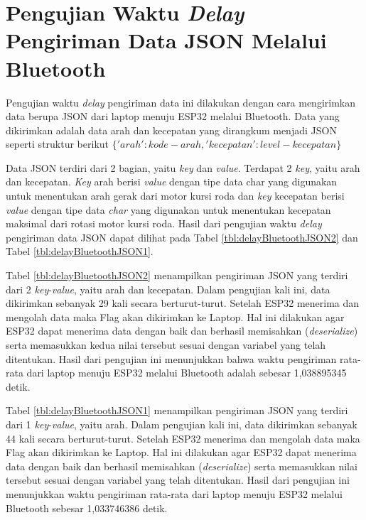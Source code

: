 \section{Pengujian Waktu \emph{Delay} Pengiriman Data JSON Melalui Bluetooth}
\label{sec:delayBluetoothJSON}

Pengujian waktu \emph{delay} pengiriman data ini dilakukan dengan cara mengirimkan data berupa JSON dari laptop menuju ESP32 melalui Bluetooth. Data yang dikirimkan adalah data arah dan kecepatan yang dirangkum menjadi JSON seperti struktur berikut \(\{'arah': kode-arah, 'kecepatan': level-kecepatan\}\) 

Data JSON terdiri dari 2 bagian, yaitu \emph{key} dan \emph{value}. Terdapat 2 \emph{key}, yaitu arah dan kecepatan. \emph{Key} arah berisi \emph{value} dengan tipe data char yang digunakan untuk menentukan arah gerak dari motor kursi roda dan \emph{key} kecepatan berisi \emph{value} dengan tipe data \emph{char} yang digunakan untuk menentukan kecepatan maksimal dari rotasi motor kursi roda. Hasil dari pengujian waktu \emph{delay} pengiriman data JSON dapat dilihat pada Tabel \ref{tbl:delayBluetoothJSON2} dan Tabel \ref{tbl:delayBluetoothJSON1}.

Tabel \ref{tbl:delayBluetoothJSON2} menampilkan pengiriman JSON yang terdiri dari 2 \emph{key}-\emph{value}, yaitu arah dan kecepatan. Dalam pengujian kali ini, data dikirimkan sebanyak 29 kali secara berturut-turut. Setelah ESP32 menerima dan mengolah data maka Flag akan dikirimkan ke Laptop. Hal ini dilakukan agar ESP32 dapat menerima data dengan baik dan berhasil memisahkan (\emph{deserialize}) serta memasukkan kedua nilai tersebut sesuai dengan variabel yang telah ditentukan. Hasil dari pengujian ini menunjukkan bahwa waktu pengiriman rata-rata dari laptop menuju ESP32 melalui Bluetooth adalah sebesar 1,038895345 detik.

Tabel \ref{tbl:delayBluetoothJSON1} menampilkan pengiriman JSON yang terdiri dari 1 \emph{key}-\emph{value}, yaitu arah. Dalam pengujian kali ini, data dikirimkan sebanyak 44 kali secara berturut-turut. Setelah ESP32 menerima dan mengolah data maka Flag akan dikirimkan ke Laptop. Hal ini dilakukan agar ESP32 dapat menerima data dengan baik dan berhasil memisahkan (\emph{deserialize}) serta memasukkan nilai tersebut sesuai dengan variabel yang telah ditentukan. Hasil dari pengujian ini menunjukkan waktu pengiriman rata-rata dari laptop menuju ESP32 melalui Bluetooth sebesar 1,033746386 detik.

